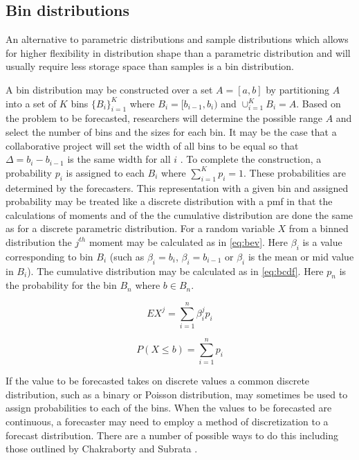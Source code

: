 \documentclass[11pt,notitlepage]{isuthesis}
\begin{document}
\subsection{Bin distributions}
An alternative to parametric distributions and sample distributions which allows
for higher flexibility in distribution shape than a parametric distribution and 
will usually require less storage space than samples is a bin 
distribution.

A bin distribution may be constructed over a set 
$A = [a, b]$ by partitioning $A$ into a set of $K$ bins $\{B_i\}_{i=1}^{K}$
where $B_i = [b_{i-1}, b_i)$ and $\cup_{i=1}^{K} B_i = A$. Based on the problem
to be forecasted, researchers will determine the possible range $A$ and 
select the number of bins and the sizes for each bin. It may be the case
that a collaborative project will set the width of all bins to be equal so that 
$\Delta = b_i - b_{i-1}$ is the same width for all $i$ 
\cite{mcgowan2019collaborative}.
To complete the construction, a probability $p_i$ is assigned to each $B_i$ 
where $\sum_{i=1}^{K}p_i = 1$. These probabilities are determined by the 
forecasters. 
This representation with a given bin and assigned probability may be 
treated like a discrete distribution with a pmf in that the calculations of 
moments and of the 
the cumulative distribution are done the same as for a discrete parametric 
distribution. For a random variable $X$ from a binned distribution 
the $j^{th}$ moment may be calculated as in \eqref{eq:bev}. 
Here $\beta_i$ is a value corresponding to bin $B_i$ (such as $\beta_i = b_i$,
$\beta_i = b_{i-1}$ or $\beta_i$ is the mean or mid value in $B_i$). The 
cumulative distribution may be calculated as in \eqref{eq:bcdf}.
Here $p_n$ is the probability for the bin $B_n$ where $b \in B_n$.

\begin{equation}
\label{eq:bev}
  EX^j = \sum_{i=1}^n \beta_i^j p_i
\end{equation}


\begin{equation}
\label{eq:bcdf}
  P(X \leq b) = \sum_{i=1}^n p_i
\end{equation}


If the value to be forecasted takes on discrete values a common discrete 
distribution, such as a binary or Poisson distribution, may sometimes be used to 
assign probabilities to each of the bins. When the values to be forecasted are
continuous, a forecaster may need to employ a method of discretization to a 
forecast distribution. There are a number of possible ways to do this including
those outlined by Chakraborty and Subrata \cite{chakraborty2015generating}.
\end{document}
